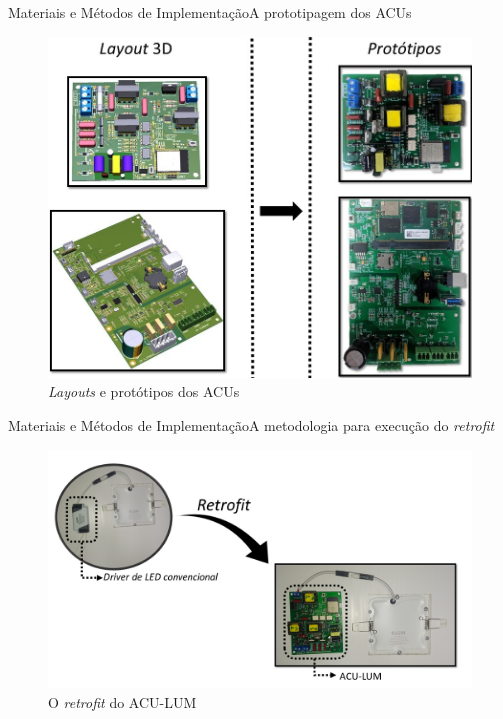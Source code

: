 \begin{frame}{Materiais e Métodos de Implementação}{A prototipagem dos ACUs}
\vspace{-0.64cm}
\begin{figure}[htp]
	\centering
	\caption{ \centering\small{{\textit{Layouts} e protótipos dos ACUs}}}
	\includegraphics[width=0.68\linewidth]{img/prots.jpg}
    \hspace{5cm}
    \vspace{5cm}
\end{figure}
\end{frame}

\begin{frame}{Materiais e Métodos de Implementação}{A metodologia para execução do \textit{retrofit}}
\vspace{-0.64cm}
\begin{figure}[htp]
	\centering
	\caption{ \centering\small{{O \textit{retrofit} do ACU-LUM}}}
	\includegraphics[width=0.98\linewidth]{img/retro_lum.png}
    \hspace{5cm}
    \vspace{1cm}
\end{figure}
\end{frame}


